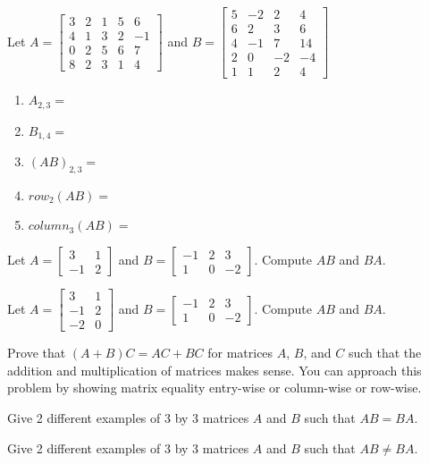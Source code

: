 \bq Let $A=\begin{bmatrix} 3&2&1&5&6\\4&1&3&2&-1\\0&2&5&6&7\\8&2&3&1&4 \end{bmatrix}$ and $B=\begin{bmatrix} 5&-2&2&4\\6&2&3&6\\4&-1&7&14\\2&0&-2&-4\\1&1&2&4 \end{bmatrix}$
\begin{enumerate}
\item $A_{2,3}=$
\item $B_{1,4}=$
\item $(AB)_{2,3}=$
\item $row_2 (AB)=$
\item $column_3 (AB)=$
\end{enumerate}
\eq

\bq Let $A=\begin{bmatrix} 3&1\\-1&2  \end{bmatrix}$ and $B=\begin{bmatrix} -1&2&3\\1&0&-2  \end{bmatrix}$. Compute $AB$ and $BA$.
\eq

\bq Let $A=\begin{bmatrix} 3&1\\-1&2 \\-2 & 0 \end{bmatrix}$ and $B=\begin{bmatrix} -1&2&3\\1&0&-2  \end{bmatrix}$. Compute $AB$ and $BA$.
\eq

\bq Prove that $(A+B)C=AC+BC$ for matrices $A$, $B$, and $C$ such that the addition and multiplication of matrices makes sense. You can approach this problem by showing matrix equality entry-wise or column-wise or row-wise.
\eq

\bq Give 2 different examples of 3 by 3 matrices $A$ and $B$ such that $AB=BA$.
\eq

\bq Give 2 different examples of 3 by 3 matrices $A$ and $B$ such that $AB \neq BA$.
\eq

